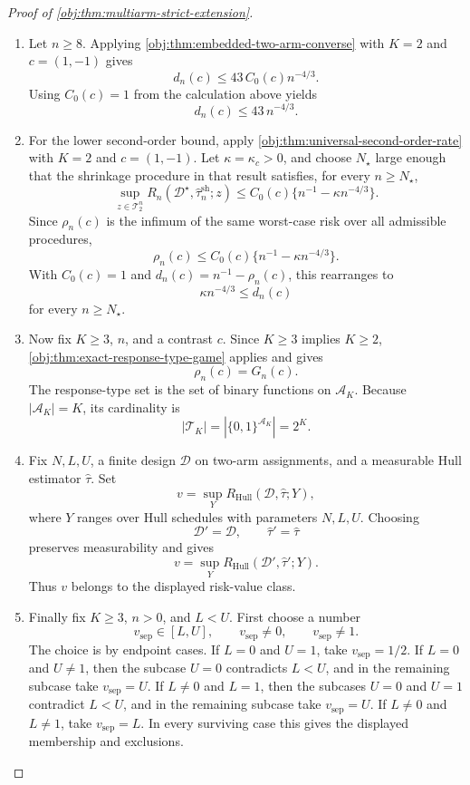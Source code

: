 \begin{proof}[Proof of \cref{obj:thm:multiarm-strict-extension}]
\begin{enumerate}
\item Let \(n\ge 8\). Applying \cref{obj:thm:embedded-two-arm-converse} with \(K=2\) and \(c=(1,-1)\) gives
\[
d_n(c)\le 43\,C_0(c)n^{-4/3}.
\]
Using \(C_0(c)=1\) from the calculation above yields
\[
d_n(c)\le 43\,n^{-4/3}.
\]

\item For the lower second-order bound, apply \cref{obj:thm:universal-second-order-rate} with \(K=2\) and \(c=(1,-1)\). Let \(\kappa=\kappa_c>0\), and choose \(N_\star\) large enough that the shrinkage procedure in that result satisfies, for every \(n\ge N_\star\),
\[
\sup_{z\in\mathcal T_2^n}
R_n(\mathcal D^\star,\widehat\tau_n^{\mathrm{sh}};z)
\le
C_0(c)\{n^{-1}-\kappa n^{-4/3}\}.
\]
Since \(\rho_n(c)\) is the infimum of the same worst-case risk over all admissible procedures,
\[
\rho_n(c)
\le
C_0(c)\{n^{-1}-\kappa n^{-4/3}\}.
\]
With \(C_0(c)=1\) and \(d_n(c)=n^{-1}-\rho_n(c)\), this rearranges to
\[
\kappa n^{-4/3}\le d_n(c)
\]
for every \(n\ge N_\star\). %

\item Now fix \(K\ge3\), \(n\), and a contrast \(c\). Since \(K\ge3\) implies \(K\ge2\), \cref{obj:thm:exact-response-type-game} applies and gives
\[
\rho_n(c)=G_n(c).
\]
The response-type set is the set of binary functions on \(\mathcal A_K\). Because \(|\mathcal A_K|=K\), its cardinality is
\[
|\mathcal T_K|=|\{0,1\}^{\mathcal A_K}|=2^K .
\]

\item Fix \(N,L,U\), a finite design \(\mathcal D\) on two-arm assignments, and a measurable Hull estimator \(\widehat\tau\). Set
\[
v=\sup_Y R_{\mathrm{Hull}}(\mathcal D,\widehat\tau;Y),
\]
where \(Y\) ranges over Hull schedules with parameters \(N,L,U\). Choosing
\[
\mathcal D'=\mathcal D,
\qquad
\widehat\tau'=\widehat\tau
\]
preserves measurability and gives
\[
v=\sup_Y R_{\mathrm{Hull}}(\mathcal D',\widehat\tau';Y).
\]
Thus \(v\) belongs to the displayed risk-value class. %

\item Finally fix \(K\ge3\), \(n>0\), and \(L<U\). First choose a number
\[
v_{\mathrm{sep}}\in [L,U],
\qquad
v_{\mathrm{sep}}\ne 0,
\qquad
v_{\mathrm{sep}}\ne 1 .
\]
The choice is by endpoint cases. If \(L=0\) and \(U=1\), take \(v_{\mathrm{sep}}=1/2\). If \(L=0\) and \(U\ne1\), then the subcase \(U=0\) contradicts \(L<U\), and in the remaining subcase take \(v_{\mathrm{sep}}=U\). If \(L\ne0\) and \(L=1\), then the subcases \(U=0\) and \(U=1\) contradict \(L<U\), and in the remaining subcase take \(v_{\mathrm{sep}}=U\). If \(L\ne0\) and \(L\ne1\), take \(v_{\mathrm{sep}}=L\). In every surviving case this gives the displayed membership and exclusions.


\end{enumerate}
\end{proof}
